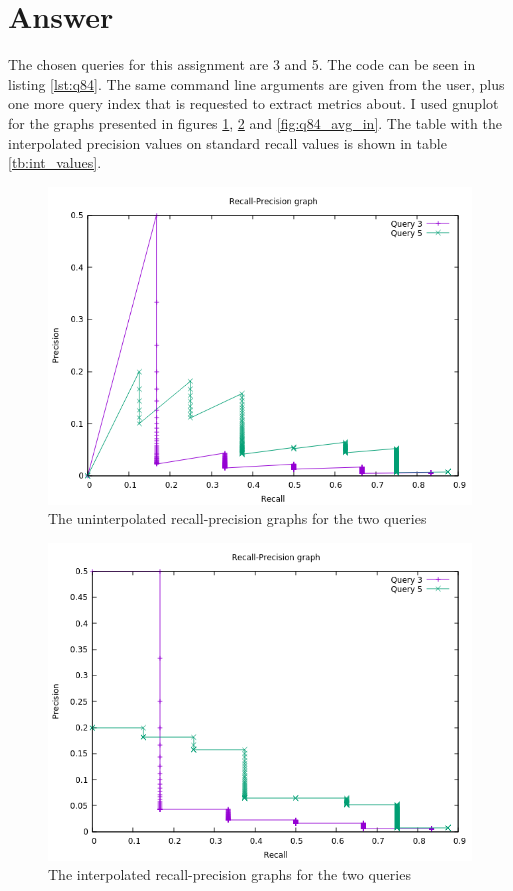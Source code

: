 \documentclass{article}
\begin{document}
	\section*{Answer}
	The chosen queries for this assignment are 3 and 5. The code can be seen in listing \ref{lst:q84}. The same command line arguments are given from the user, plus one more query index that is requested to extract metrics about. I used gnuplot for the graphs presented in figures \ref{fig:q84_un}, \ref{fig:q84_in} and \ref{fig:q84_avg_in}. The table with the interpolated precision values on standard recall values is shown in table \ref{tb:int_values}.
	
	\begin{figure}[h]
		\includegraphics[width=.85\linewidth]{unint_q84.png}
		\caption{The uninterpolated recall-precision graphs for the two queries}
		\label{fig:q84_un}
	\end{figure} 
	\begin{figure}
		\includegraphics[width=.85\linewidth]{int_q84.png}
		\caption{The interpolated recall-precision graphs for the two queries}
		\label{fig:q84_in}
	\end{figure}
\end{document}
